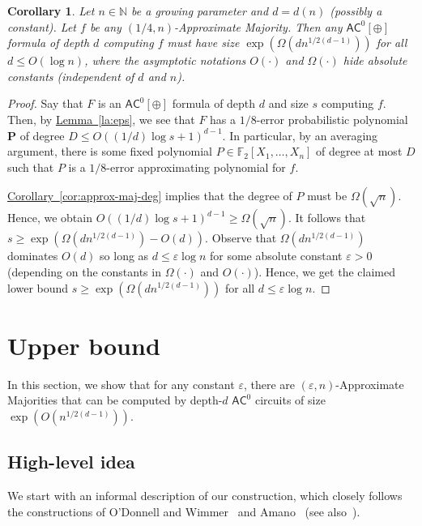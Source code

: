 \documentclass[11pt]{article}
\numberwithin{equation}{section}
\newtheorem{corollary}[theorem]{Corollary}
\theoremstyle{definition}
\theoremstyle{plain}
\newcommand{\cclass}[1]{\textsf{#1}}
\newcommand{\expref}[2]{\hyperref[#2]{#1~\ref{#2}}}
\newcommand{\eps}{\varepsilon}
\newcommand{\mb}{\mathbf}
\newcommand{\F}{\mathbb{F}}
\newcommand{\AC}{\cclass{AC}}
\begin{document}
\begin{corollary}
\label{cor:formula-lbd}
Let $n\in \mathbb{N}$ be a growing parameter and $d = d(n)$ (possibly a constant). 
Let $f$ be any $(1/4,n)$-Approximate Majority. Then any $\AC^0[\oplus]$ formula of depth $d$ computing $f$ must have size $\exp(\Omega(dn^{1/2(d-1)}))$ for all $d \le O(\log n)$, where the asymptotic notations $O(\cdot)$ and $\Omega(\cdot)$ hide absolute constants (independent of $d$ and $n$). 
\end{corollary}

\begin{proof}
Say that $F$ is an $\AC^0[\oplus]$ formula of depth $d$ and size $s$ computing $f$. Then, by \expref{Lemma}{la:eps}, we see that $F$ has a $1/8$-error probabilistic polynomial $\mb P$ of degree $D\leq O(({1}/{d})\log s+1)^{d-1}$. In particular, by an averaging argument, there is some fixed polynomial $P\in \F_2[X_1,\ldots,X_n]$ of degree at most $D$ such that $P$ is a $1/8$-error approximating polynomial for $f$. 

\expref{Corollary}{cor:approx-maj-deg} implies that the degree of $P$ must be $\Omega(\sqrt{n})$. Hence, we obtain $O(({1}/{d})\log s+1)^{d-1} \ge \Omega(\sqrt{n})$. It follows that
$s \ge \exp(\Omega(dn^{1/2(d-1)}) - O(d))$.
Observe that $\Omega(dn^{1/2(d-1)})$ dominates $O(d)$ so long as $d \le \eps \log n$ for some absolute constant $\eps > 0$ (depending on the constants in $\Omega(\cdot)$ and $O(\cdot)$). Hence, we get the claimed lower bound  $s \ge \exp(\Omega(dn^{1/2(d-1)}))$
for all $d \le \eps\log n$.
\end{proof}


%
\section{Upper bound}      %

In this section, we show that for any constant $\varepsilon$, there are $(\varepsilon,n)$-Approximate Majorities that can be computed by depth-$d$ $\AC^0$ circuits of size $\exp(O(n^{1/2(d-1)}))$.

\subsection{High-level idea}

We start with an informal description of our construction, which closely follows the constructions of O'Donnell and Wimmer~\cite{odonnellwimmer} and Amano~\cite{Amano-appxmaj} (see also~\cite{Valiant-maj,hoory2006monotone}).
\end{document}
